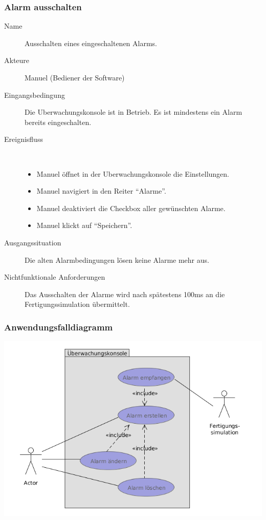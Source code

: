 \documentclass[parskip=full]{scrartcl}
\begin{document}
\subsubsection{Alarm ausschalten}
\begin{description}
 \item[Name] Ausschalten eines eingeschaltenen Alarms.
 \item[Akteure] Manuel (Bediener der Software)
 \item[Eingangsbedingung] Die \gls{Uberwachungskonsole} ist in Betrieb. Es ist mindestens ein Alarm bereits eingeschalten.
 \item[Ereignisfluss]~\\
 \begin{itemize}[noitemsep]
  \item Manuel \"offnet in der \gls{Uberwachungskonsole} die Einstellungen.
  \item Manuel navigiert in den Reiter "`Alarme"'.
  \item Manuel deaktiviert die Checkbox aller gew\"unschten Alarme.
  \item Manuel klickt auf "`Speichern"'.
 \end{itemize}
 \item[Ausgangssituation] Die alten Alarmbedingungen l\"osen keine Alarme mehr aus.
 \item [Nichtfunktionale Anforderungen] Das Ausschalten der Alarme wird nach sp\"atestens 100ms an die \gls{Fertigungssimulation} \"ubermittelt.
\end{description}

\subsubsection{Anwendungsfalldiagramm}
\begin{center}
  \includegraphics[scale=0.7]{media/UseCases/Ueberwachungskonsole.png}
\end{center}
\end{document}
